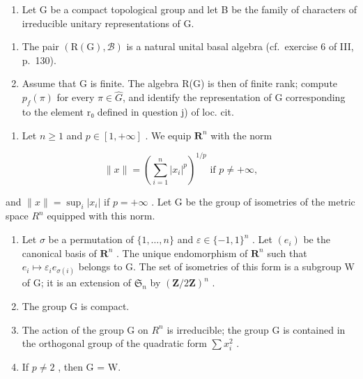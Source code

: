 \exercisesection{}

\begin{enumerate}
\def\labelenumi{\arabic{enumi})}
\tightlist
\item
  Let G be a compact topological group and let B be the family of characters of irreducible unitary representations of G.
\end{enumerate}

\begin{enumerate}
\def\labelenumi{\alph{enumi})}
\item
  The pair \((\mathrm{R}(\mathrm{G}),\mathcal{B})\) is a natural unital basal algebra (cf.~exercise 6 of III, p.~130).
\item
  Assume that G is finite. The algebra R(G) is then of finite rank; compute \(p_f(\pi)\) for every \(\pi \in \widehat{G}\), and identify the representation of G corresponding to the element r₀ defined in question j) of loc. cit.
\end{enumerate}

\begin{enumerate}
\def\labelenumi{\arabic{enumi})}
\setcounter{enumi}{1}
\tightlist
\item
  Let \(n \geqslant 1\) and \(p \in [1, +\infty]\) . We equip \(\mathbf{R}^n\) with the norm
\end{enumerate}

\[
\| x \| = \left(\sum_ {i = 1} ^ {n} | x _ {i} | ^ {p}\right) ^ {1 / p} \text {   if   } p \neq + \infty ,
\]

and \(\|x\| = \sup_{i}|x_{i}|\) if \(p = +\infty\) . Let G be the group of isometries of the metric space \(R^{n}\) equipped with this norm.

\begin{enumerate}
\def\labelenumi{\alph{enumi})}
\item
  Let \(\sigma\) be a permutation of \(\{1,\ldots,n\}\) and \(\varepsilon\in\{-1,1\}^{n}\) . Let \((e_{i})\) be the canonical basis of \(\mathbf{R}^{n}\) . The unique endomorphism of \(\mathbf{R}^{n}\) such that \(e_{i}\mapsto\varepsilon_{i}e_{\sigma(i)}\) belongs to G. The set of isometries of this form is a subgroup W of G; it is an extension of \(\mathfrak{S}_{n}\) by \((\mathbf{Z}/2\mathbf{Z})^{n}\) .
\item
  The group G is compact.
\item
  The action of the group G on \(R^{n}\) is irreducible; the group G is contained in the orthogonal group of the quadratic form \(\sum x_{i}^{2}\) .
\item
  If \(p \neq 2\) , then G = W.
\end{enumerate}

